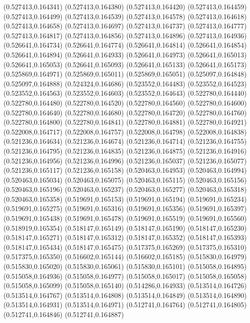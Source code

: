 (0.527413,0.164341)
(0.527413,0.164380)
(0.527413,0.164420)
(0.527413,0.164459)
(0.527413,0.164499)
(0.527413,0.164539)
(0.527413,0.164578)
(0.527413,0.164618)
(0.527413,0.164658)
(0.527413,0.164697)
(0.527413,0.164737)
(0.527413,0.164777)
(0.527413,0.164817)
(0.527413,0.164856)
(0.527413,0.164896)
(0.527413,0.164936)
(0.526641,0.164734)
(0.526641,0.164774)
(0.526641,0.164814)
(0.526641,0.164854)
(0.526641,0.164894)
(0.526641,0.164933)
(0.526641,0.164973)
(0.526641,0.165013)
(0.526641,0.165053)
(0.526641,0.165093)
(0.526641,0.165133)
(0.526641,0.165173)
(0.525869,0.164971)
(0.525869,0.165011)
(0.525869,0.165051)
(0.525097,0.164848)
(0.525097,0.164888)
(0.524324,0.164686)
(0.523552,0.164483)
(0.523552,0.164523)
(0.523552,0.164563)
(0.523552,0.164603)
(0.523552,0.164643)
(0.522780,0.164440)
(0.522780,0.164480)
(0.522780,0.164520)
(0.522780,0.164560)
(0.522780,0.164600)
(0.522780,0.164640)
(0.522780,0.164680)
(0.522780,0.164720)
(0.522780,0.164760)
(0.522780,0.164800)
(0.522780,0.164841)
(0.522780,0.164881)
(0.522780,0.164921)
(0.522008,0.164717)
(0.522008,0.164757)
(0.522008,0.164798)
(0.522008,0.164838)
(0.521236,0.164634)
(0.521236,0.164674)
(0.521236,0.164714)
(0.521236,0.164755)
(0.521236,0.164795)
(0.521236,0.164835)
(0.521236,0.164875)
(0.521236,0.164916)
(0.521236,0.164956)
(0.521236,0.164996)
(0.521236,0.165037)
(0.521236,0.165077)
(0.521236,0.165117)
(0.521236,0.165158)
(0.520463,0.164953)
(0.520463,0.164994)
(0.520463,0.165034)
(0.520463,0.165075)
(0.520463,0.165115)
(0.520463,0.165156)
(0.520463,0.165196)
(0.520463,0.165237)
(0.520463,0.165277)
(0.520463,0.165318)
(0.520463,0.165358)
(0.519691,0.165153)
(0.519691,0.165194)
(0.519691,0.165234)
(0.519691,0.165275)
(0.519691,0.165316)
(0.519691,0.165356)
(0.519691,0.165397)
(0.519691,0.165438)
(0.519691,0.165478)
(0.519691,0.165519)
(0.519691,0.165560)
(0.518919,0.165354)
(0.518147,0.165149)
(0.518147,0.165190)
(0.518147,0.165230)
(0.518147,0.165271)
(0.518147,0.165312)
(0.518147,0.165352)
(0.518147,0.165393)
(0.518147,0.165434)
(0.518147,0.165475)
(0.517375,0.165269)
(0.517375,0.165310)
(0.517375,0.165350)
(0.516602,0.165144)
(0.516602,0.165185)
(0.515830,0.164979)
(0.515830,0.165020)
(0.515830,0.165061)
(0.515830,0.165101)
(0.515058,0.164895)
(0.515058,0.164936)
(0.515058,0.164977)
(0.515058,0.165017)
(0.515058,0.165058)
(0.515058,0.165099)
(0.515058,0.165140)
(0.514286,0.164933)
(0.513514,0.164726)
(0.513514,0.164767)
(0.513514,0.164808)
(0.513514,0.164849)
(0.513514,0.164890)
(0.513514,0.164931)
(0.513514,0.164971)
(0.512741,0.164764)
(0.512741,0.164805)
(0.512741,0.164846)
(0.512741,0.164887)
